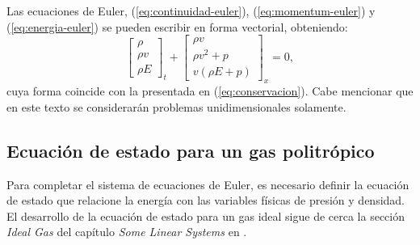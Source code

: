 Las ecuaciones de Euler, (\ref{eq:continuidad-euler}), (\ref{eq:momentum-euler}) y (\ref{eq:energia-euler}) se pueden escribir en forma vectorial, obteniendo:
\begin{equation}
	\begin{bmatrix}
		\rho \\
		\rho v \\
		\rho E
	\end{bmatrix}_{t}
+
	\begin{bmatrix}
		\rho v \\
		\rho v^{2}+p \\
		v(\rho E + p)
	\end{bmatrix}_{x}
= 0,
\label{eq:euler-eqs-1}
\end{equation}
cuya forma coincide con la presentada en (\ref{eq:conservacion}). Cabe mencionar que en este texto se considerarán problemas unidimensionales solamente.


\subsection{Ecuación de estado para un gas politrópico}
Para completar el sistema de ecuaciones de Euler, es necesario definir la ecuación de estado que relacione la energía con las variables físicas de presión y  densidad. El desarrollo de la ecuación de estado para un gas ideal sigue de cerca la sección \textit{Ideal Gas} del capítulo \textit{Some Linear Systems} en \cite{LeVeque}.

